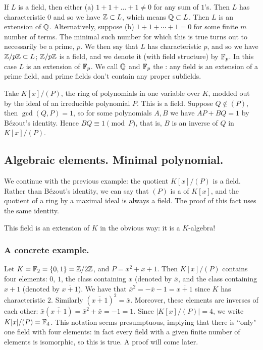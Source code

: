 \begin{ex}
If $L$ is a field, then either (a) $1 + 1 + \ldots + 1 \neq 0$ for any sum of $1$'s. Then $L$ has characteristic $0$ and so we have $\mathbb{Z} \subset L$, which means $\mathbb{Q} \subset L$. Then $L$ is an extension of $\mathbb{Q}$. Alternatively, suppose (b) $1 + 1 + \dotsb + 1 = 0$ for some finite $m$ number of terms. The minimal such number for which this is true turns out to necessarily be a prime, $p$. We then say that $L$ has characteristic $p$, and so we have $\mathbb{Z} / p\mathbb{Z} \subset L$; $\mathbb{Z} / p\mathbb{Z}$ is a field, and we denote it (with field structure) by $\mathbb{F}_p$. In this case $L$ is an extension of $\mathbb{F}_p$. We call $\mathbb{Q}$ and $\mathbb{F}_p$ the : any field is an extension of a prime field, and prime fields don't contain any proper subfields.
\end{ex}

\begin{ex}
Take $K[x]/(P)$, the ring of polynomials in one variable over $K$, modded out by the ideal of an irreducible polynomial $P$. This is a field. Suppose $Q \notin (P)$, then $\gcd(Q, P) = 1$, so for some polynomials $A, B$ we have $AP + BQ = 1$ by B\'{e}zout's identity. Hence $BQ \equiv 1 \pmod P$, that is, $B$ is an inverse of $Q$ in $K[x]/(P)$.
\end{ex}

\subsection{Algebraic elements. Minimal polynomial.}
We continue with the previous example: the quotient $K[x]/(P)$ is a field. Rather than B\'{e}zout's identity, we can say that $(P)$ is a  of $K[x]$, and the quotient of a ring by a maximal ideal is always a field. The proof of this fact uses the same identity.

This field is an extension of $K$ in the obvious way: it is a $K$-algebra!

\subsubsection*{A concrete example.} 
Let $K = \mathbb{F}_2 = \{0, 1\} = \mathbb{Z} / 2\mathbb{Z}$, and $P = x^2 + x + 1$. Then $K[x] / (P)$ contains four elements: $0$, $1$, the class containing $x$ (denoted by $\bar{x}$, and the class containing $x + 1$ (denoted by $\overline{x + 1}$). We have that $\bar{x}^2 = -\bar{x} - 1 = \overline{x + 1}$ since $K$ has characteristic $2$. Similarly $(\overline{x + 1})^2 = \bar{x}$. Moreover, these elements are inverses of each other: $\bar{x}(\overline{x + 1}) = \bar{x}^2 + \bar{x} = -1 = 1$. Since $|K[x] / (P)| = 4$, we write $K[x] / (P) = \mathbb{F}_4$. This notation seems presumptuous, implying that there is ``only" one field with four elements: in fact every field with a given finite number of elements is isomorphic, so this is true. A proof will come later.

